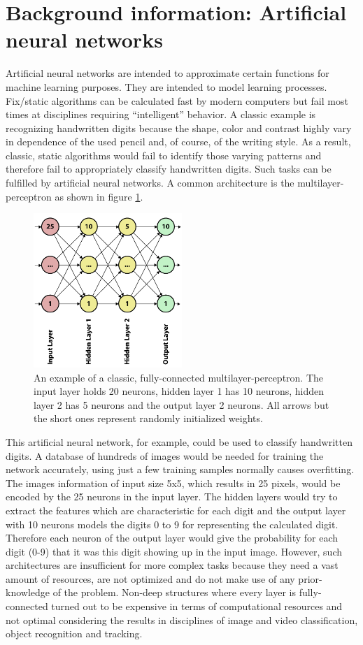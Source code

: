 \documentclass[12pt,twoside]{article}
\theoremstyle{plain}
\theoremstyle{definition}
\theoremstyle{remark}
\begin{document}
\section{Background information: Artificial neural networks}
\label{sec:ann}


Artificial neural networks are intended to approximate certain functions for machine learning purposes. They are intended to model learning processes. Fix/static algorithms can be calculated fast by modern computers but fail most times at disciplines requiring \enquote{intelligent} behavior. A classic example is recognizing handwritten digits because the shape, color and contrast highly vary in dependence of the used pencil and, of course, of the writing style. As a result, classic, static algorithms would fail to identify those varying patterns and therefore fail to appropriately classify handwritten digits. Such tasks can be fulfilled by artificial neural networks. A common architecture is the multilayer-perceptron as shown in figure \ref{fig:mlp1}.
\begin{figure}
	\includegraphics[width=0.5\textwidth]{neuralnet1.pdf}
	{\caption{An example of a classic, fully-connected multilayer-perceptron. The input layer holds 20 neurons, hidden layer 1 has 10 neurons, hidden layer 2 has 5 neurons and the output layer 2 neurons. All arrows but the short ones represent randomly initialized weights.}\label{fig:mlp1}}
\end{figure}
This artificial neural network, for example, could be used to classify handwritten digits. A database of hundreds of images would be needed for training the network accurately, using just a few training samples normally causes overfitting. The images information of input size 5x5, which results in 25 pixels, would be encoded by the 25 neurons in the input layer. The hidden layers would try to extract the features which are characteristic for each digit and the output layer with 10 neurons models the digits 0 to 9 for representing the calculated digit. Therefore each neuron of the output layer would give the probability for each digit (0-9) that it was this digit showing up in the input image. However, such architectures are insufficient for more complex tasks because they need a vast amount of resources, are not optimized and do not make use of any prior-knowledge of the problem. Non-deep structures where every layer is fully-connected turned out to be expensive in terms of computational resources and not optimal considering the results in disciplines of image and video classification, object recognition and tracking.
\end{document}
